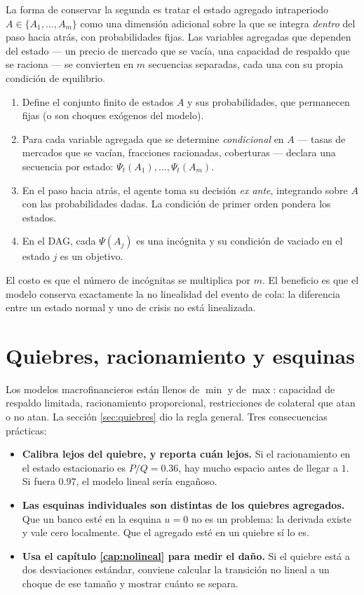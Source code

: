 La forma de conservar la segunda es tratar el estado agregado intraperiodo
$A\in\{A_1,\dots,A_m\}$ como una dimensión adicional sobre la que se integra
\emph{dentro} del paso hacia atrás, con probabilidades fijas. Las variables
agregadas que dependen del estado --- un precio de mercado que se vacía, una
capacidad de respaldo que se raciona --- se convierten en $m$ secuencias
separadas, cada una con su propia condición de equilibrio.

\begin{receta}
\begin{enumerate}[leftmargin=1.4em,itemsep=2pt]
\item Define el conjunto finito de estados $A$ y sus probabilidades, que
permanecen fijas (o son choques exógenos del modelo).
\item Para cada variable agregada que se determine \emph{condicional} en $A$
--- tasas de mercados que se vacían, fracciones racionadas, coberturas ---
declara una secuencia por estado: $\Psi_t(A_1),\dots,\Psi_t(A_m)$.
\item En el paso hacia atrás, el agente toma su decisión \emph{ex ante},
integrando sobre $A$ con las probabilidades dadas. La condición de primer orden
pondera los estados.
\item En el DAG, cada $\Psi(A_j)$ es una incógnita y su condición de vaciado en
el estado $j$ es un objetivo.
\end{enumerate}
\end{receta}

El costo es que el número de incógnitas se multiplica por $m$. El beneficio es
que el modelo conserva exactamente la no linealidad del evento de cola: la
diferencia entre un estado normal y uno de crisis no está linealizada.

\section{Quiebres, racionamiento y esquinas}

Los modelos macrofinancieros están llenos de $\min$ y de $\max$: capacidad de
respaldo limitada, racionamiento proporcional, restricciones de colateral que
atan o no atan. La sección \ref{sec:quiebres} dio la regla general. Tres
consecuencias prácticas:

\begin{itemize}[leftmargin=1.4em]
\item \textbf{Calibra lejos del quiebre, y reporta cuán lejos.} Si el racionamiento
en el estado estacionario es $P/Q = 0.36$, hay mucho espacio antes de llegar a
$1$. Si fuera $0.97$, el modelo lineal sería engañoso.
\item \textbf{Las esquinas individuales son distintas de los quiebres
agregados.} Que un banco esté en la esquina $u=0$ no es un problema: la
derivada existe y vale cero localmente. Que el agregado esté en un quiebre sí lo
es.
\item \textbf{Usa el capítulo \ref{cap:nolineal} para medir el daño.} Si el
quiebre está a dos desviaciones estándar, conviene calcular la transición no
lineal a un choque de ese tamaño y mostrar cuánto se separa.
\end{itemize}

